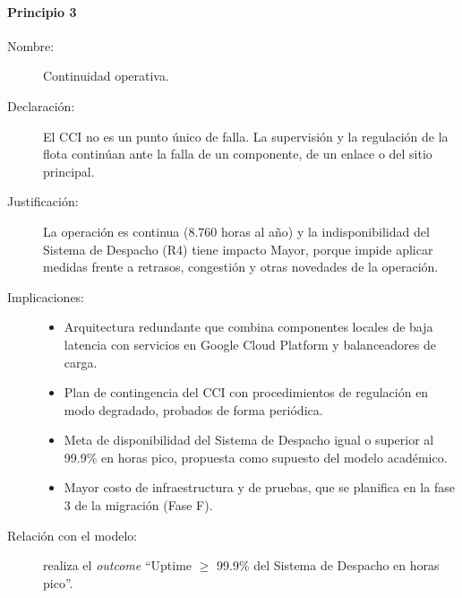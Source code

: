 \paragraph{Principio 3}
\begin{description}
	\item[Nombre:] Continuidad operativa.
	\item[Declaración:] El CCI no es un punto único de falla. La supervisión y la regulación de la flota continúan ante la falla de un componente, de un enlace o del sitio principal.
	\item[Justificación:] La operación es continua (8.760 horas al año) y la indisponibilidad del Sistema de Despacho (R4) tiene impacto Mayor, porque impide aplicar medidas frente a retrasos, congestión y otras novedades de la operación.
	\item[Implicaciones:] \hfill
	      \begin{itemize}
		      \item Arquitectura redundante que combina componentes locales de baja latencia con servicios en Google Cloud Platform y balanceadores de carga.
		      \item Plan de contingencia del CCI con procedimientos de regulación en modo degradado, probados de forma periódica.
		      \item Meta de disponibilidad del Sistema de Despacho igual o superior al 99.9\% en horas pico, propuesta como supuesto del modelo académico.
		      \item Mayor costo de infraestructura y de pruebas, que se planifica en la fase 3 de la migración (Fase F).
	      \end{itemize}
	\item[Relación con el modelo:] realiza el \textit{outcome} ``Uptime $\geq$ 99.9\% del Sistema de Despacho en horas pico''.
\end{description}

